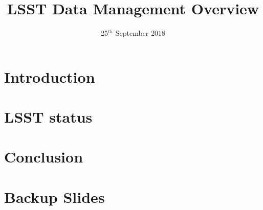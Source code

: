 \documentclass[t,aspectratio=169]{beamer}
\title{LSST Data Management Overview  }
\date{25$^{th}$ September 2018}
\begin{document}
\maketitle
\section{Introduction}

\section{LSST status}



\section{Conclusion}


\appendix
\section{Backup Slides}
%

\end{document}
